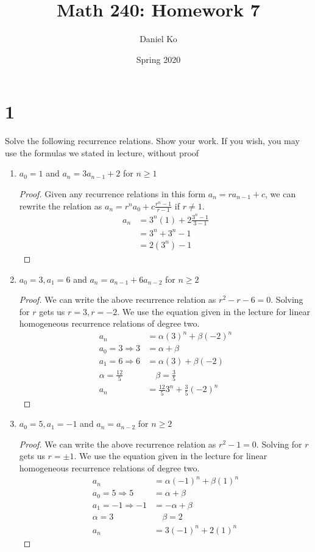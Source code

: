 \documentclass[11pt]{scrartcl}
\title{Math 240: Homework 7}
\author{Daniel Ko}
\date{Spring 2020}
\begin{document}
\maketitle

\section{1}
Solve the following recurrence relations. Show your work. If you wish,
you may use the formulas we stated in lecture, without proof
\begin{enumerate}[label=\alph*.]
	\item{
		$a_0 = 1$ and $a_n = 3a_{n-1} + 2$ for $n \geq 1$
		\begin{proof}
			Given any recurrence relations in this form $a_n = ra_{n-1} + c$, we can rewrite the relation as
			$a_{n}=r^{n} a_{0}+c \frac{r^{n}-1}{r-1}$ if $r \neq 1$.
			\begin{align*}
				a_{n} & = 3^{n}(1) + 2 \frac{3^{n}-1}{3-1} \\
				& = 3^{n} + 3^{n}-1\\
				& = 2(3^{n}) -1
			\end{align*}
		\end{proof}
	}
	\item{
		$a_{0}=3, a_{1}=6$ and $a_{n}=a_{n-1}+6 a_{n-2}$ for $n \geq 2$
		\begin{proof}
			We can write the above recurrence relation as $r^2 - r - 6 = 0$. Solving for $r$ gets us $r = 3, r = -2$.
			We use the equation given in the lecture for linear homogeneous recurrence relations of degree two.
			\begin{align*}
			a_n & = \alpha(3)^n + \beta(-2)^n\\
			a_{0}=3 \Rightarrow 3 & = \alpha + \beta \\
			a_{1}=6 \Rightarrow 6 & = \alpha (3) + \beta (-2)\\
			\alpha = \frac{12}{5} \quad & \quad \beta = \frac{3}{5}\\ 
			a_n & = \frac{12}{5} 3^n + \frac{3}{5} (-2)^n 
			\end{align*}
		\end{proof}
	}
	\item{
		$a_{0}=5, a_{1}=-1$ and $a_{n}=a_{n-2}$ for $n \geq 2$
		\begin{proof}
			We can write the above recurrence relation as $r^2 - 1 = 0$. Solving for $r$ gets us $r = \pm 1$.
			We use the equation given in the lecture for linear homogeneous recurrence relations of degree two.
			\begin{align*}
			a_n & = \alpha(-1)^n + \beta(1)^n\\
			a_{0}=5 \Rightarrow 5 & = \alpha + \beta \\
			a_{1}=-1 \Rightarrow -1 & = -\alpha + \beta\\
			\alpha = 3 \quad & \quad \beta = 2\\ 
			a_n & = 3(-1)^n + 2(1)^n
			\end{align*}
		\end{proof}
	}
\end{enumerate}
\end{document}
